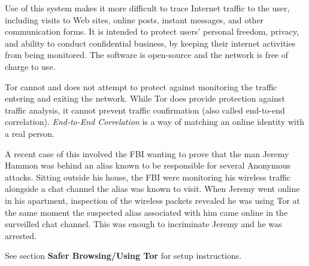 Use of this system makes it more difficult to trace Internet traffic to
the user, including visits to Web sites, online posts, instant messages,
and other communication forms. It is intended to protect users' personal
freedom, privacy, and ability to conduct confidential business, by
keeping their internet activities from being monitored. The software is
open-source and the network is free of charge to use.

Tor cannot and does not attempt to protect against monitoring the
traffic entering and exiting the network. While Tor does provide
protection against traffic analysis, it cannot prevent traffic
confirmation (also called end-to-end correlation). \emph{End-to-End
Correlation} is a way of matching an online identity with a real person.

A recent case of this involved the FBI wanting to prove that the man
Jeremy Hammon was behind an alias known to be responsible for several
Anonymous attacks. Sitting outside his house, the FBI were monitoring
his wireless traffic alongside a chat channel the alias was known to
visit. When Jeremy went online in his apartment, inspection of the
wireless packets revealed he was using Tor at the same moment the
suspected alias associated with him came online in the surveilled chat
channel. This was enough to incriminate Jeremy and he was arrested.

See section \textbf{Safer Browsing/Using Tor} for setup instructions.
